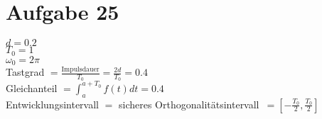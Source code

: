 

	\section*{Aufgabe 25}
		$d = 0.2$\\
		$T_0 = 1$\\
		$\omega_0 = 2\pi$\\
		Tastgrad $= \frac{\text{Impulsdauer}}{T_0} = \frac{2d}{T_0} = 0.4$\\
		Gleichanteil $= \int_{a}^{a+T_0} f(t) dt = 0.4$\\
		Entwicklungsintervall $=$ \glqq sicheres Orthogonalitätsintervall\grqq\ $= \left[-\frac{T_0}{2},\frac{T_0}{2}\right]$
